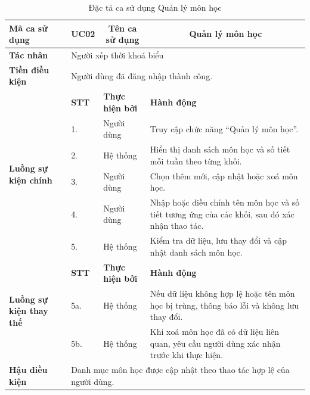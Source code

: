 \documentclass[../DoAn.tex]{subfiles}
\begin{document}
\begin{longtable}{|p{2.8cm}|p{1cm}|p{2.8cm}|p{6.3cm}|}
\caption{Đặc tả ca sử dụng Quản lý môn học}
\label{tab:app_uc_quan_ly_mon_hoc} \\
\hline
\multicolumn{1}{|l|}{\textbf{Mã ca sử dụng}} & \multicolumn{1}{c|}{UC02} &
\multicolumn{1}{c|}{\textbf{Tên ca sử dụng}} & \multicolumn{1}{c|}{Quản lý môn học} \\
\hline
\multicolumn{1}{|l|}{\textbf{Tác nhân}} & \multicolumn{3}{l|}{Người xếp thời khoá biểu} \\
\hline
\multicolumn{1}{|l|}{\textbf{Tiền điều kiện}} & \multicolumn{3}{l|}{Người dùng đã đăng nhập thành công.} \\
\hline
\multirow{6}{2.8cm}{\textbf{Luồng sự kiện chính}} & \textbf{STT} & \textbf{Thực hiện bởi} & \textbf{Hành động} \\
\cline{2-4}
& 1. & Người dùng & Truy cập chức năng ``Quản lý môn học''. \\
\cline{2-4}
& 2. & Hệ thống & Hiển thị danh sách môn học và số tiết mỗi tuần theo từng khối. \\
\cline{2-4}
& 3. & Người dùng & Chọn thêm mới, cập nhật hoặc xoá môn học. \\
\cline{2-4}
& 4. & Người dùng & Nhập hoặc điều chỉnh tên môn học và số tiết tương ứng của các khối, sau đó xác nhận thao tác. \\
\cline{2-4}
& 5. & Hệ thống & Kiểm tra dữ liệu, lưu thay đổi và cập nhật danh sách môn học. \\
\hline
\multirow{3}{2.8cm}{\textbf{Luồng sự kiện thay thế}} & \textbf{STT} & \textbf{Thực hiện bởi} & \textbf{Hành động} \\
\cline{2-4}
& 5a. & Hệ thống & Nếu dữ liệu không hợp lệ hoặc tên môn học bị trùng, thông báo lỗi và không lưu thay đổi. \\
\cline{2-4}
& 5b. & Hệ thống & Khi xoá môn học đã có dữ liệu liên quan, yêu cầu người dùng xác nhận trước khi thực hiện. \\
\hline
\multicolumn{1}{|l|}{\textbf{Hậu điều kiện}} & \multicolumn{3}{p{10.5cm}|}{Danh mục môn học được cập nhật theo thao tác hợp lệ của người dùng.} \\
\hline
\end{longtable}
\end{document}
